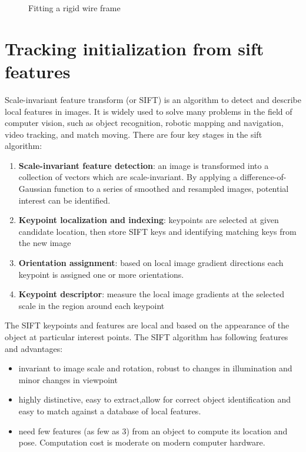 \begin{figure}
\begin{minipage}[t]{0.45\linewidth}
    \label{subfig:iteration 3}
  \end{minipage} 
  \begin{minipage}[t]{0.45\linewidth} 
    \centering 
  \end{minipage} 
\caption{Fitting a rigid wire frame}
\end{figure}


\section{Tracking initialization from sift features}

Scale-invariant feature transform (or SIFT) is an algorithm to detect
and describe local features in images.  It is widely used to solve
many problems in the field of computer vision, such as object
recognition, robotic mapping and navigation, video tracking, and match
moving. There are four key stages in the sift algorithm\cite{lowe2004distinctive}:
\begin{enumerate}
\item \textbf{Scale-invariant feature detection}: an image is transformed into
  a collection of vectors which are scale-invariant. By applying a difference-of-Gaussian
function to a series of smoothed and resampled images, potential
interest can be identified.
\item \textbf{Keypoint localization and indexing}: keypoints are selected at given
  candidate location, then store SIFT keys and identifying matching keys from the new image
\item \textbf{Orientation assignment}:  based on local image gradient
  directions each keypoint is assigned one or more orientations.
\item \textbf{Keypoint descriptor}: measure the local image gradients
  at the selected scale in the region around each keypoint
\end{enumerate}


The SIFT keypoints and features are local and based on the appearance
of the object at particular interest points. The SIFT algorithm has following
features and advantages:
\begin{itemize}
\item invariant to image scale and rotation, robust to changes in
  illumination and minor changes in viewpoint
\item highly distinctive, easy to extract,allow for correct object
  identification and easy to match against a database of local
  features. 
\item need few features (as few as 3) from an object to compute its location
  and pose. Computation cost is moderate on modern computer hardware.
\end{itemize}

